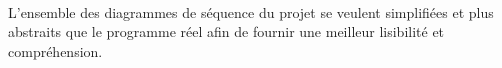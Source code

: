 \paragraph{}L'ensemble des diagrammes de séquence du projet se veulent simplifiées et plus abstraits que le programme réel afin de fournir une meilleur lisibilité et compréhension.